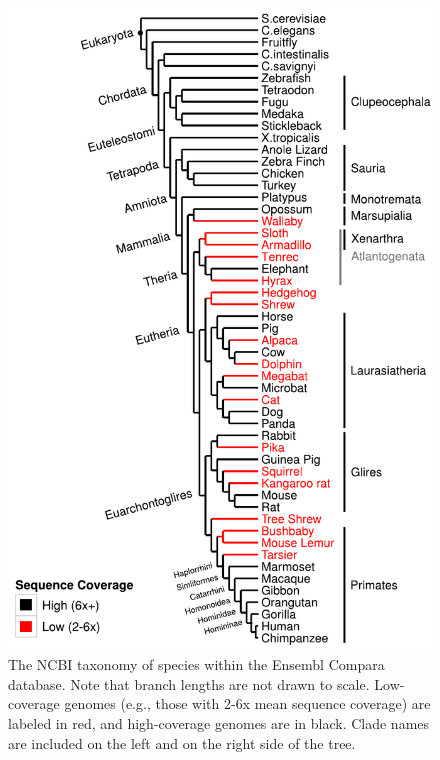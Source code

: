 \begin{figure}[p!]
\centering
\includegraphics[scale=0.7]{Figs/species_tree.pdf}
\caption{The NCBI taxonomy of species within the Ensembl Compara
  database. Note that branch lengths are not drawn to
  scale. Low-coverage genomes (e.g., those with 2-6x mean sequence
  coverage) are labeled in red, and high-coverage genomes are in
  black. Clade names are included on the left and on the right side of
  the tree.}
\label{ncbi_tree}
\end{figure}


